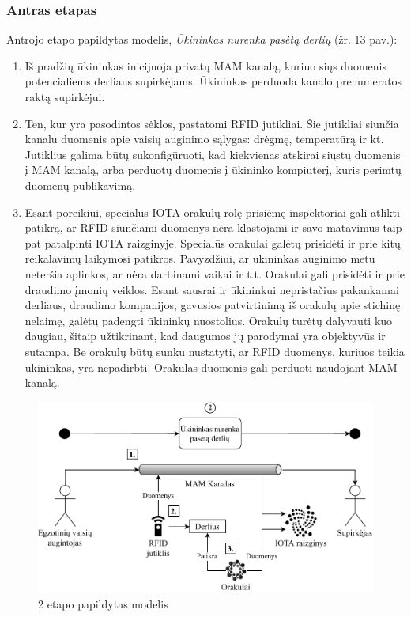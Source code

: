 \subsubsection{Antras etapas}

Antrojo etapo papildytas modelis, \textit{Ūkininkas nurenka pasėtą derlių} (žr. 13 pav.):
\begin{enumerate}
    \item Iš pradžių ūkininkas inicijuoja privatų MAM kanalą, kuriuo siųs duomenis potencialiems derliaus supirkėjams. Ūkininkas perduoda kanalo prenumeratos raktą supirkėjui.
    \item Ten, kur yra pasodintos sėklos, pastatomi RFID jutikliai. Šie jutikliai siunčia kanalu duomenis apie vaisių auginimo sąlygas: drėgmę, temperatūrą ir kt. Jutiklius galima būtų sukonfigūruoti, kad kiekvienas atskirai siųstų duomenis į MAM kanalą, arba perduotų duomenis į ūkininko kompiuterį, kuris perimtų duomenų publikavimą.
    \item Esant poreikiui, specialūs IOTA orakulų rolę prisiėmę inspektoriai gali atlikti patikrą, ar RFID siunčiami duomenys nėra klastojami ir savo matavimus taip pat patalpinti IOTA raizginyje. Specialūs orakulai galėtų prisidėti ir prie kitų reikalavimų laikymosi patikros. Pavyzdžiui, ar ūkininkas auginimo metu neteršia aplinkos, ar nėra darbinami vaikai ir t.t. Orakulai gali prisidėti ir prie draudimo įmonių veiklos. Esant sausrai ir ūkininkui nepristačius pakankamai derliaus, draudimo kompanijos, gavusios patvirtinimą iš orakulų apie stichinę nelaimę, galėtų padengti ūkininkų nuostolius. Orakulų turėtų dalyvauti kuo daugiau, šitaip užtikrinant, kad daugumos jų parodymai yra objektyvūs ir sutampa. Be orakulų būtų sunku nustatyti, ar RFID duomenys, kuriuos teikia ūkininkas, yra nepadirbti. Orakulas duomenis gali perduoti naudojant MAM kanalą.
\end{enumerate}

\begin{figure}[H]
    \centering
    \includegraphics[scale=0.7]{images/iota-usecase-2}
    \caption{2 etapo papildytas modelis}
\end{figure}



